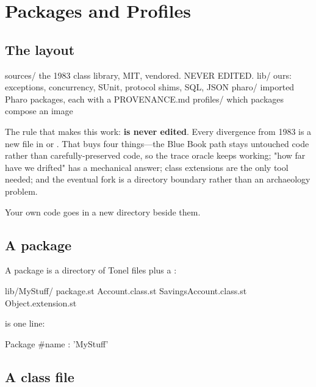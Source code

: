 \chapter{Packages and Profiles}
\label{ch:packages}


\section{The layout}

\begin{plain}
sources/     the 1983 class library, MIT, vendored.  NEVER EDITED.
lib/         ours: exceptions, concurrency, SUnit, protocol shims, SQL, JSON
pharo/       imported Pharo packages, each with a PROVENANCE.md
profiles/    which packages compose an image
\end{plain}

The rule that makes this work: \textbf{ is never edited}. Every
divergence from 1983 is a new file in  or . That buys
four things---the Blue Book path stays untouched code rather than
carefully-preserved code, so the trace oracle keeps working; "how far have we
drifted" has a mechanical answer; class extensions are the only tool needed;
and the eventual fork is a directory boundary rather than an archaeology
problem.

Your own code goes in a new directory beside them.

\section{A package}

A package is a directory of Tonel files plus a :

\begin{plain}
lib/MyStuff/
    package.st
    Account.class.st
    SavingsAccount.class.st
    Object.extension.st
\end{plain}

 is one line:

\begin{st}
Package { #name : 'MyStuff' }
\end{st}

\section{A class file}

